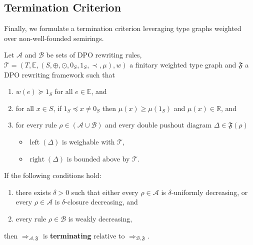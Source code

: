 \subsection{Termination Criterion}
\label{sec:nwf:proving_termination}
Finally, we formulate a termination criterion leveraging type graphs weighted over non-well-founded semirings. 
\begin{theorem} 
    \label{thm:termination_grs}
    Let $\mathcal{A}$ and $\mathcal{B}$ be sets of DPO rewriting rules, $\mathcal{T} = (T,\mathbb{E}, (S, \oplus, \odot, 0_S, 1_S, \prec, \mu), w)$ a finitary weighted type graph and $\mathfrak{F}$ a DPO rewriting framework such that

     \begin{enumerate}[label=\roman*)]
        \item\label{thm1:hyp3} $w(e) \succeq 1_S$ for all $e \in \mathbb{E}$, and
        \item\label{thm1:hyp4} for all $x \in S$, if $ 1_S \preceq x \neq 0_S$ then $\mu(x) \geq \mu(1_S)$ and $\mu(x) \in \mathbb{R}$, and
        \item for every rule $\rho \in (\mathcal{A }\cup \mathcal{B })$ and every double pushout diagram  
        $\Delta \in \mathfrak{F}(\rho)$ 
        \begin{itemize}
            \item \(\operatorname{left}(\Delta)\) is weighable with \(\mathcal{T}\),
            \item \(\operatorname{right}(\Delta)\) is bounded above by \(\mathcal{T}\). 
        \end{itemize}
    \end{enumerate}       

    \noindent If the following conditions hold:
    \begin{enumerate}
        \item there exists $\delta >0$ such that either every $\rho \in \mathcal{A}$ is $\delta$-uniformly decreasing, or every $\rho \in \mathcal{A}$ is $\delta$-closure decreasing, and
        \item every rule $\rho \in \mathcal{B}$ is weakly decreasing,
    \end{enumerate}
    then $\Rightarrow_{\mathcal{A},\mathfrak{F}}$ is \textbf{terminating} relative to $\Rightarrow_{\mathcal{B},\mathfrak{F}}$.
\end{theorem} 

